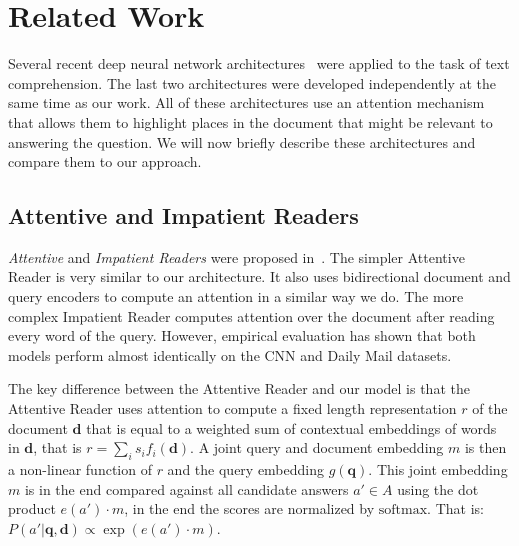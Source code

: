 \documentclass[11pt]{article}
\newcommand{\RUDA}[1]{{\color{black}#1}}
\newcommand{\ctxTransducer}{f}
\newcommand{\queryEncoder}{g}
\newcommand{\embed}{e}
\newcommand{\querySeq}{\mathbf{q}}
\newcommand{\documentSeq}{\mathbf{d}}
\begin{document}
\section{Related Work}
\RUDA{
Several recent deep neural network architectures~\cite{hermann2015teaching,hill2015goldilocks,chen2016thorough,Kobayashi2016} were applied to the task of text comprehension. The last two architectures were developed independently at the same time as our work. All of these architectures use an attention mechanism that allows them to highlight places in the document that might be relevant to answering the question. We will now briefly describe these architectures and compare them to our approach. 


\subsection{Attentive and Impatient Readers}\label{subsec:attReaderComparison}
\emph{Attentive} and \emph{Impatient Readers} were proposed in~\cite{hermann2015teaching}. 
The simpler Attentive Reader is very similar to our architecture. 
It also uses bidirectional document and query encoders 
to compute an attention in a similar way we do. 
The more complex Impatient Reader computes attention over the document after reading every word of the query. 
However, empirical evaluation has shown that both models perform almost identically on the CNN and Daily Mail datasets.

The key difference between the Attentive Reader and our model is that the Attentive Reader uses attention to compute a fixed length representation $r$ of the document $\documentSeq$ that is equal to a weighted sum of contextual embeddings of words in $\documentSeq$, that is $r = \sum_i s_i \ctxTransducer_i(\documentSeq)$.
A joint query and document embedding $m$ is then a non-linear function of $r$ and the query embedding $\queryEncoder(\querySeq)$. This joint embedding $m$ is in the end compared against all candidate answers $a' \in A$ using the dot product $\embed(a') \cdot m$, in the end the scores are normalized by $\text{softmax}$. That is: $P(a'|\querySeq,\documentSeq) \propto \exp \left(e(a') \cdot m \right)$. 
}
\end{document}
